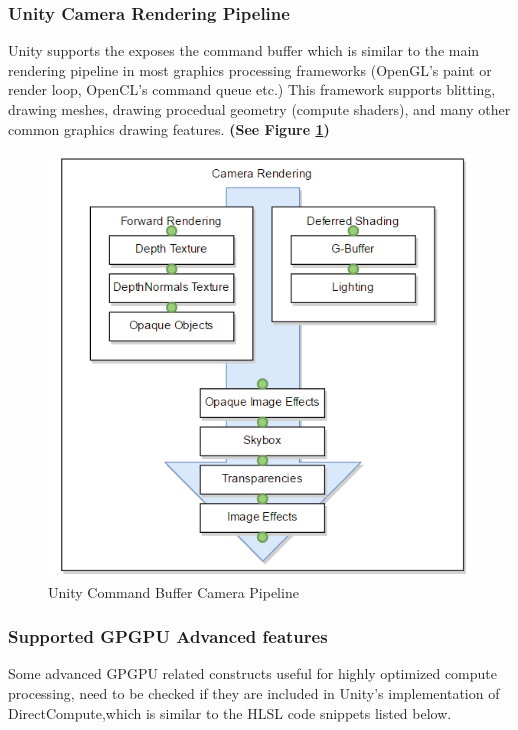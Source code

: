\documentclass[a4paper,10pt]{article}
\begin{document}
\pagebreak


\subsubsection{Unity Camera Rendering Pipeline}
Unity supports the exposes the command buffer which is similar to the main rendering pipeline in most graphics processing frameworks (OpenGL's paint or render loop, OpenCL's command queue etc.) This framework supports blitting, drawing meshes, drawing procedual geometry (compute shaders), and many other common graphics drawing features. \textbf{(See Figure \ref{fig:gpuPipe})}

\begin{figure}[H]
	\includegraphics[width=\linewidth,height=\paperheight,keepaspectratio]{cameraRender.png}
	\caption{Unity Command Buffer Camera Pipeline}
	\label{fig:gpuPipe}
	\end{figure}

\pagebreak

\subsubsection{Supported GPGPU Advanced features}
Some advanced GPGPU related constructs useful for highly optimized compute processing, need to be checked if they are included in Unity's implementation of DirectCompute,which 
is similar to the HLSL code snippets listed below.
\end{document}
